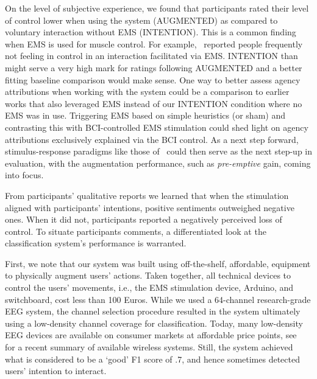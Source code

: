 On the level of subjective experience, we found that participants rated their level of control lower when using the system (AUGMENTED) as compared to voluntary interaction without EMS (INTENTION). This is a common finding when EMS is used for muscle control. For example,~\citet{Lopes2015-dk} reported people frequently not feeling in control in an interaction facilitated via EMS. INTENTION than might serve a very high mark for ratings following AUGMENTED and a better fitting baseline comparison would make sense. One way to better assess agency attributions when working with the system could be a comparison to earlier works that also leveraged EMS instead of our INTENTION condition where no EMS was in use. Triggering EMS based on simple heuristics (or sham) and contrasting this with BCI-controlled EMS stimulation could shed light on agency attributions exclusively explained via the BCI control. As a next step forward, stimulus-response paradigms like those of~\citet{Kasahara2019-sk, Kasahara2021-gy} could then serve as the next step-up in evaluation, with the augmentation performance, such as \textit{pre-emptive} gain, coming into focus.

From participants' qualitative reports we learned that when the stimulation aligned with participants' intentions, positive sentiments outweighed negative ones. When it did not, participants reported a negatively perceived loss of control. To situate participants comments, a differentiated look at the classification system's performance is warranted.

First, we note that our system was built using off-the-shelf, affordable, equipment to physically augment users' actions. Taken together, all technical devices to control the users' movements, i.e., the EMS stimulation device, Arduino, and switchboard, cost less than 100 Euros. While we used a 64-channel research-grade EEG system, the channel selection procedure resulted in the system ultimately using a low-density channel coverage for classification. Today, many low-density EEG devices are available on consumer markets at affordable price points, see~\citet{Niso2023-ce} for a recent summary of available wireless systems. Still, the system achieved what is considered to be a `good' F1 score of .7, and hence sometimes detected users' intention to interact.

